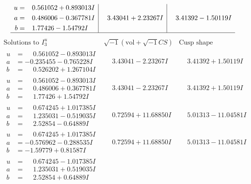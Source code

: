 \documentclass[1p]{elsarticle_modified}
\theoremstyle{definition}
\newcommand{\I}{\sqrt{-1}}
\begin{document}
$$\begin{array}{c|c|c}
\begin{aligned}
u &= \phantom{-}0.561052 + 0.893013 I \\
a &= \phantom{-}0.486006 - 0.367781 I \\
b &= \phantom{-}1.77426 - 1.54792 I\end{aligned}
 & \phantom{-}3.43041 + 2.23267 I & \phantom{-}3.41392 - 1.50119 I\\
 \hline 
 \end{array}$$\newpage$$\begin{array}{c|c|c}  
\text{Solutions to }I^u_{3}& \I (\text{vol} + \sqrt{-1}CS) & \text{Cusp shape}\\
 \hline 
\begin{aligned}
u &= \phantom{-}0.561052 - 0.893013 I \\
a &= -0.235455 - 0.765228 I \\
b &= \phantom{-}0.526202 + 1.267104 I\end{aligned}
 & \phantom{-}3.43041 - 2.23267 I & \phantom{-}3.41392 + 1.50119 I \\ \hline\begin{aligned}
u &= \phantom{-}0.561052 - 0.893013 I \\
a &= \phantom{-}0.486006 + 0.367781 I \\
b &= \phantom{-}1.77426 + 1.54792 I\end{aligned}
 & \phantom{-}3.43041 - 2.23267 I & \phantom{-}3.41392 + 1.50119 I \\ \hline\begin{aligned}
u &= \phantom{-}0.674245 + 1.017385 I \\
a &= \phantom{-}1.235031 - 0.519035 I \\
b &= \phantom{-}2.52854 - 0.64889 I\end{aligned}
 & \phantom{-}0.72594 + 11.68850 I & \phantom{-}5.01313 - 11.04581 I \\ \hline\begin{aligned}
u &= \phantom{-}0.674245 + 1.017385 I \\
a &= -0.576962 - 0.288535 I \\
b &= -1.59779 + 0.81587 I\end{aligned}
 & \phantom{-}0.72594 + 11.68850 I & \phantom{-}5.01313 - 11.04581 I \\ \hline\begin{aligned}
u &= \phantom{-}0.674245 - 1.017385 I \\
a &= \phantom{-}1.235031 + 0.519035 I \\
b &= \phantom{-}2.52854 + 0.64889 I\end{aligned}

\end{array}$$
\end{document}
